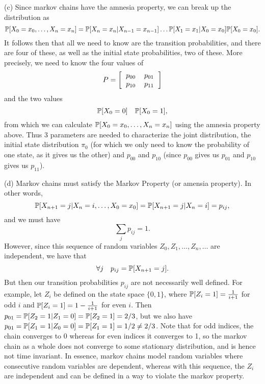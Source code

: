 (c) Since markov chains have the amnesia property, we can break up the distribution as
\[
    \P[X_0 = x_0, \dots, X_n = x_n] = \P[X_n = x_n | X_{n - 1} = x_{n - 1}]\dots\P[X_1 = x_1 | X_0 = x_0]\P[X_0 = x_0].
\]
It follows then that all we need to know are the transition probabilities, and there are four of these, as well as the initial state probabilities, two of these. More precisely, we need to know the four values of
\[P = \left[\begin{tabular}{cc}
    $p_{00}$ & $p_{01}$ \\
    $p_{10}$ & $p_{11}$
\end{tabular}\right]\]
and the two values
\[
\P[X_0 = 0] \quad \P[X_0 = 1],
\]
from which we can calculate $\P[X_0 = x_0, \dots, X_n = x_n]$ using the amnesia property above. Thus 3 parameters are needed to characterize the joint distribution, the initial state distribution $\pi_0$ (for which we only need to know the probability of one state, as it gives us the other) and $p_{00}$ and $p_{10}$ (since $p_{00}$ gives us $p_{01}$ and $p_{10}$ gives us $p_{11}$).

(d) Markov chains must satisfy the Markov Property (or amensia property). In other words,
\[
    \P[X_{n + 1} = j | X_n = i, \dots, X_0 = x_0] = \P[X_{n + 1} = j | X_n = i] = p_{ij},
\]
and we must have
\[
    \sum_j p_{ij} = 1.
\]
However, since this sequence of random variables $Z_0, Z_1, \dots, Z_n, \dots$ are independent, we have that
\[
   \forall j \quad p_{ij} = \P[X_{n + 1} = j].
\]
But then our transition probabilities $p_{ij}$ are not necessarily well defined. For example, let $Z_i$ be defined on the state space $\{0, 1\}$, where $\P[Z_i = 1] = \frac{1}{i + 1}$ for odd $i$ and $\P[Z_i = 1] = 1 - \frac{1}{i + 1}$ for even $i$. Then $p_{01} = \P[Z_2 = 1 | Z_1 = 0] = \P[Z_2 = 1] = 2/3$, but we also have $p_{01} = \P[Z_1 = 1|Z_0 = 0] = \P[Z_1 = 1] = 1/2 \neq 2/3$. Note that for odd indices, the chain converges to 0 whereas for even indices it converges to 1, so the markov chain as a whole does not converge to some stationary distribution, and is hence not time invariant. In essence, markov chains model random variables where consecutive random variables are dependent, whereas with this sequence, the $Z_i$ are independent and can be defined in a way to violate the markov property.


